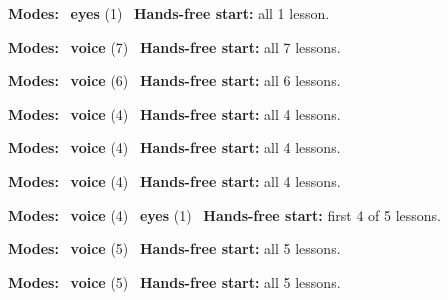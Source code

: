 \expandafter\def\csname hlchaptermodality40\endcsname{%
  {\small\noindent
    \textbf{Modes:} \hlsightsign{}~\textbf{eyes} (1)\quad
    \hlvoicesign{}~\textbf{Hands-free start:} all 1 lesson.%
    \par}\medskip
}

\expandafter\def\csname hlchaptermodality41\endcsname{%
  {\small\noindent
    \textbf{Modes:} \hlvoicesign{}~\textbf{voice} (7)\quad
    \hlvoicesign{}~\textbf{Hands-free start:} all 7 lessons.%
    \par}\medskip
}

\expandafter\def\csname hlchaptermodality42\endcsname{%
  {\small\noindent
    \textbf{Modes:} \hlvoicesign{}~\textbf{voice} (6)\quad
    \hlvoicesign{}~\textbf{Hands-free start:} all 6 lessons.%
    \par}\medskip
}

\expandafter\def\csname hlchaptermodality43\endcsname{%
  {\small\noindent
    \textbf{Modes:} \hlvoicesign{}~\textbf{voice} (4)\quad
    \hlvoicesign{}~\textbf{Hands-free start:} all 4 lessons.%
    \par}\medskip
}

\expandafter\def\csname hlchaptermodality44\endcsname{%
  {\small\noindent
    \textbf{Modes:} \hlvoicesign{}~\textbf{voice} (4)\quad
    \hlvoicesign{}~\textbf{Hands-free start:} all 4 lessons.%
    \par}\medskip
}

\expandafter\def\csname hlchaptermodality45\endcsname{%
  {\small\noindent
    \textbf{Modes:} \hlvoicesign{}~\textbf{voice} (4)\quad
    \hlvoicesign{}~\textbf{Hands-free start:} all 4 lessons.%
    \par}\medskip
}

\expandafter\def\csname hlchaptermodality46\endcsname{%
  {\small\noindent
    \textbf{Modes:} \hlvoicesign{}~\textbf{voice} (4) \quad \hlsightsign{}~\textbf{eyes} (1)\quad
    \hlvoicesign{}~\textbf{Hands-free start:} first 4 of 5 lessons.%
    \par}\medskip
}

\expandafter\def\csname hlchaptermodality47\endcsname{%
  {\small\noindent
    \textbf{Modes:} \hlvoicesign{}~\textbf{voice} (5)\quad
    \hlvoicesign{}~\textbf{Hands-free start:} all 5 lessons.%
    \par}\medskip
}

\expandafter\def\csname hlchaptermodality48\endcsname{%
  {\small\noindent
    \textbf{Modes:} \hlvoicesign{}~\textbf{voice} (5)\quad
    \hlvoicesign{}~\textbf{Hands-free start:} all 5 lessons.%
    \par}\medskip
}

